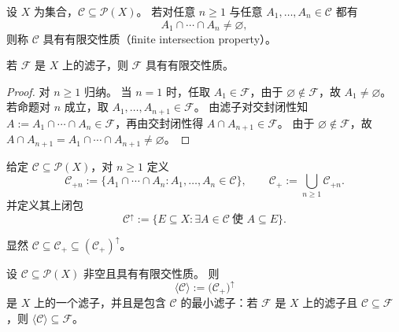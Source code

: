 \documentclass[lang=cn,a4paper,newtx,section]{elegantbook}
\begin{document}
\begin{definition}[有限交性质]
设 $X$ 为集合，$\mathcal C\subseteq\mathcal P(X)$。
若对任意 $n\ge 1$ 与任意 $A_1,\dots,A_n\in\mathcal C$ 都有
\[
  A_1\cap\cdots\cap A_n\neq\varnothing,
\]
则称 $\mathcal C$ 具有有限交性质（finite intersection property）。
\end{definition}

\begin{proposition}
若 $\mathcal F$ 是 $X$ 上的滤子，则 $\mathcal F$ 具有有限交性质。
\end{proposition}

\begin{proof}
对 $n\ge 1$ 归纳。
当 $n=1$ 时，任取 $A_1\in\mathcal F$，由于 $\varnothing\notin\mathcal F$，故 $A_1\neq\varnothing$。
若命题对 $n$ 成立，取 $A_1,\dots,A_{n+1}\in\mathcal F$。
由滤子对交封闭性知 $A:=A_1\cap\cdots\cap A_n\in\mathcal F$，再由交封闭性得 $A\cap A_{n+1}\in\mathcal F$。
由于 $\varnothing\notin\mathcal F$，故 $A\cap A_{n+1}=A_1\cap\cdots\cap A_{n+1}\neq\varnothing$。
\end{proof}

\begin{definition}
给定 $\mathcal C\subseteq\mathcal P(X)$，对 $n\ge 1$ 定义
\[
  \mathcal C_{+n}:=\{A_1\cap\cdots\cap A_n: A_1,\dots,A_n\in\mathcal C\},\qquad \mathcal C_{+}:=\bigcup_{n\ge 1}\mathcal C_{+n}.
\]
并定义其上闭包
\[
  \mathcal C^{\uparrow}:=\{E\subseteq X:\exists A\in\mathcal C\ \text{使 }A\subseteq E\}.
\]
\end{definition}

\begin{remark}
显然 $\mathcal C\subseteq\mathcal C_{+}\subseteq(\mathcal C_{+})^{\uparrow}$。
\end{remark}

\begin{proposition}[由有限交性质生成滤子]
设 $\mathcal C\subseteq\mathcal P(X)$ 非空且具有有限交性质。
则
\[
  \langle\mathcal C\rangle:=\bigl(\mathcal C_{+}\bigr)^{\uparrow}
\]
是 $X$ 上的一个滤子，并且是包含 $\mathcal C$ 的最小滤子：若 $\mathcal F$ 是 $X$ 上的滤子且 $\mathcal C\subseteq\mathcal F$，则 $\langle\mathcal C\rangle\subseteq\mathcal F$。
\end{proposition}
\end{document}
